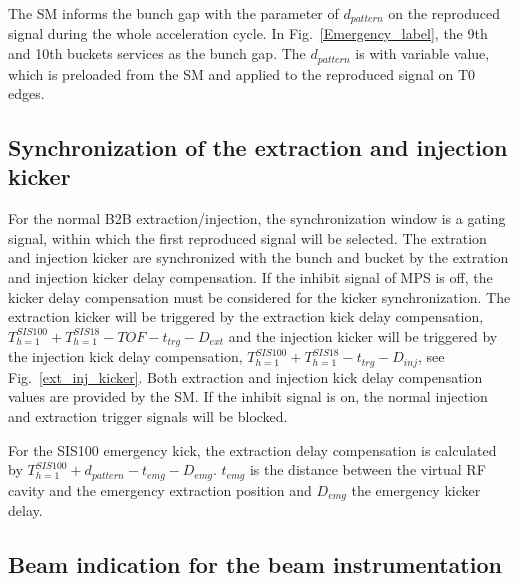 \begin{itemize}
\begin{itemize}
The SM informs the bunch gap with the parameter of $d_{pattern}$ on the reproduced signal during the whole acceleration cycle. In Fig.~\ref{Emergency_label}, the 9th and 10th buckets services as the bunch gap. The $d_{pattern}$ is with variable value, which is preloaded from the SM and applied to the reproduced signal on T0 edges.

\end{itemize}

\end{itemize}

\subsection{Synchronization of the extraction and injection kicker}
For the normal B2B extraction/injection, the synchronization window is a gating signal, within which the first reproduced signal will be selected. The extration and injection kicker are synchronized with the bunch and bucket by the extration and injection kicker delay compensation. If the inhibit signal of MPS is off, the kicker delay compensation must be considered for the kicker synchronization. The extraction kicker will be triggered by the extraction kick delay compensation, $T_{h=1}^{SIS100} + T_{h=1}^{SIS18} -TOF - t_{trg} - D_{ext}$ and the injection kicker will be triggered by the injection kick delay compensation, $T_{h=1}^{SIS100} + T_{h=1}^{SIS18} - t_{trg} - D_{inj}$, see Fig.~\ref{ext_inj_kicker}. Both extraction and injection kick delay compensation values are provided by the SM. If the inhibit signal is on, the normal injection and extraction trigger signals will be blocked.

For the SIS100 emergency kick, the extraction delay compensation is calculated by $T_{h=1}^{SIS100} + d_{pattern} - t_{emg} - D_{emg}$. $t_{emg}$ is the distance between the virtual RF cavity and the emergency extraction position and $D_{emg}$ the emergency kicker delay.


\subsection{Beam indication for the beam instrumentation}

